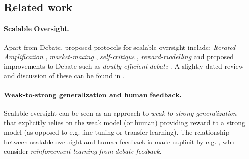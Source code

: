 %

\subsection{Related work}
\label{solib:sec:related}

\paragraph{Scalable Oversight.} Apart from Debate, proposed protocols for scalable oversight include: \emph{Iterated Amplification} \citep{christiano2018IDA}, \emph{market-making} \citep{evanhubingerAISafetyMarket2020}, \emph{self-critique} \citep{saunders2022selfcritique}, \emph{reward-modelling} \citep{leike2018RewardModeling} and proposed improvements to Debate such as \emph{doubly-efficient debate} \citep{brown-cohenScalableAISafety2023}. A slightly dated review and discussion of these can be found in \citet{bowmanMeasuringProgressScalable2022}. 

\paragraph{Weak-to-strong generalization and human feedback.} Scalable oversight can be seen as an approach to \emph{weak-to-strong generalization} \citep{sangWeak2Strong, langWeak2Strong} that explicitly relies on the weak model (or human) providing reward to a strong model (as opposed to e.g. fine-tuning or transfer learning). The relationship between scalable oversight and human feedback is made explicit by e.g. \citet{cheng2024RLHFDebate}, who consider \emph{reinforcement learning from debate feedback}.

